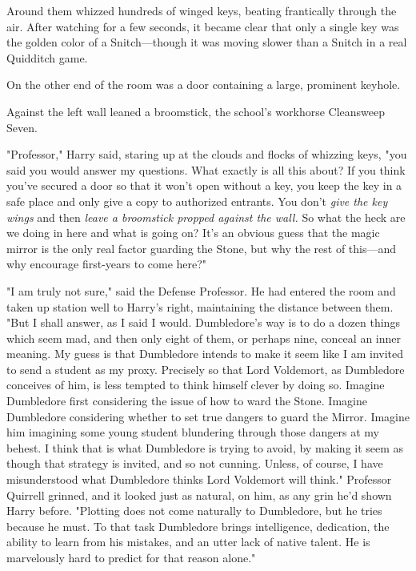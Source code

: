Around them whizzed hundreds of winged keys, beating frantically through the 
air. After watching for a few seconds, it became clear that only a single key 
was the golden color of a Snitch---though it was moving slower than a Snitch in 
a real Quidditch game.

On the other end of the room was a door containing a large, prominent keyhole.

Against the left wall leaned a broomstick, the school's workhorse Cleansweep 
Seven.

"Professor," Harry said, staring up at the clouds and flocks of whizzing keys, 
"you said you would answer my questions. What exactly is all this about? If you 
think you've secured a door so that it won't open without a key, you keep the 
key in a safe place and only give a copy to authorized entrants. You don't 
\emph{give the key wings} and then \emph{leave a broomstick propped against the 
wall.} So what the heck are we doing in here and what is going on? It's an 
obvious guess that the magic mirror is the only real factor guarding the Stone, 
but why the rest of this---and why encourage first-years to come here?"

"I am truly not sure," said the Defense Professor. He had entered the room and 
taken up station well to Harry's right, maintaining the distance between them. 
"But I shall answer, as I said I would. Dumbledore's way is to do a dozen 
things which seem mad, and then only eight of them, or perhaps nine, conceal an 
inner meaning. My guess is that Dumbledore intends to make it seem like I am 
invited to send a student as my proxy. Precisely so that Lord Voldemort, as 
Dumbledore conceives of him, is less tempted to think himself clever by doing 
so. Imagine Dumbledore first considering the issue of how to ward the Stone. 
Imagine Dumbledore considering whether to set true dangers to guard the Mirror. 
Imagine him imagining some young student blundering through those dangers at my 
behest. I think that is what Dumbledore is trying to avoid, by making it seem 
as though that strategy is invited, and so not cunning. Unless, of course, I 
have misunderstood what Dumbledore thinks Lord Voldemort will think." Professor 
Quirrell grinned, and it looked just as natural, on him, as any grin he'd shown 
Harry before. "Plotting does not come naturally to Dumbledore, but he tries 
because he must. To that task Dumbledore brings intelligence, dedication, the 
ability to learn from his mistakes, and an utter lack of native talent. He is 
marvelously hard to predict for that reason alone."

